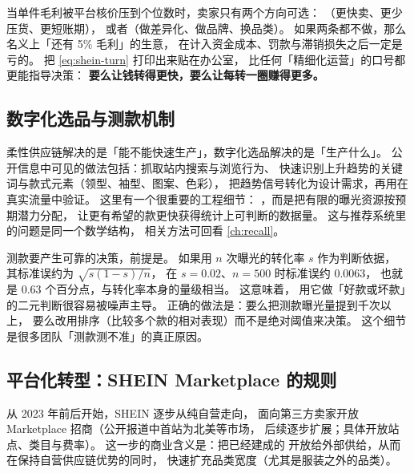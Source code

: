 \begin{keypoint}[周转率是低毛利业务的唯一出路]
当单件毛利被平台核价压到个位数时，卖家只有两个方向可选：
（更快卖、更少压货、更短账期），
或者（做差异化、做品牌、换品类）。
如果两条都不做，那么名义上「还有 5\% 毛利」的生意，
在计入资金成本、罚款与滞销损失之后一定是亏的。
把 \cref{eq:shein-turn} 打印出来贴在办公室，
比任何「精细化运营」的口号都更能指导决策：
\textbf{要么让钱转得更快，要么让每转一圈赚得更多。}
\end{keypoint}

\subsection{数字化选品与测款机制}

柔性供应链解决的是「能不能快速生产」，数字化选品解决的是「生产什么」。
公开信息中可见的做法包括：抓取站内搜索与浏览行为、
快速识别上升趋势的关键词与款式元素（领型、袖型、图案、色彩），
把趋势信号转化为设计需求，再用在真实流量中验证。
这里有一个很重要的工程细节：
，而是把有限的曝光资源按预期潜力分配，
让更有希望的款更快获得统计上可判断的数据量。
这与推荐系统里的问题是同一个数学结构，
相关方法可回看 \cref{ch:recall}。

测款要产生可靠的决策，前提是。
如果用 $n$ 次曝光的转化率 $s$ 作为判断依据，
其标准误约为 $\sqrt{s(1-s)/n}$，
在 $s = 0.02$、$n = 500$ 时标准误约 0.0063，
也就是 0.63 个百分点，与转化率本身的量级相当。
这意味着，
用它做「好款或坏款」的二元判断很容易被噪声主导。
正确的做法是：要么把测款曝光量提到千次以上，
要么改用排序（比较多个款的相对表现）而不是绝对阈值来决策。
这个细节是很多团队「测款测不准」的真正原因。

\subsection{平台化转型：SHEIN Marketplace 的规则}

从 2023 年前后开始，SHEIN 逐步从纯自营走向，
面向第三方卖家开放 Marketplace 招商（公开报道中首站为北美等市场，
后续逐步扩展；具体开放站点、类目与费率）。
这一步的商业含义是：把已经建成的
开放给外部供给，从而在保持自营供应链优势的同时，
快速扩充品类宽度（尤其是服装之外的品类）。

